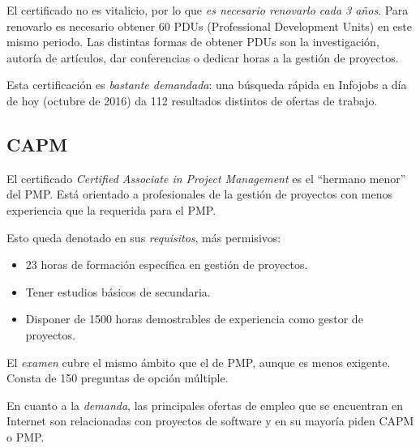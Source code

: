 El certificado no es vitalicio, por lo que \emph{es necesario renovarlo cada 3 años}. Para renovarlo es necesario obtener 60 PDUs (Professional Development Units) en este mismo periodo. Las distintas formas de obtener PDUs son la investigación, autoría de artículos, dar conferencias o dedicar horas a la gestión de proyectos.

Esta certificación es \emph{bastante demandada}: una búsqueda rápida en Infojobs a día de hoy (octubre de 2016) da 112 resultados distintos de ofertas de trabajo.

\subsection{CAPM}

El certificado \emph{Certified Associate in Project Management} es el ``hermano menor'' del PMP. Está orientado a profesionales de la gestión de proyectos con menos experiencia que la requerida para el PMP.

Esto queda denotado en sus \emph{requisitos}, más permisivos:

\begin{itemize}
\item 23 horas de formación específica en gestión de proyectos.
\item Tener estudios básicos de secundaria.
\item Disponer de 1500 horas demostrables de experiencia como gestor de proyectos.
\end{itemize}

El \emph{examen} cubre el mismo ámbito que el de PMP, aunque es menos exigente. Consta de 150 preguntas de opción múltiple.

En cuanto a la \emph{demanda}, las principales ofertas de empleo que se encuentran en Internet son relacionadas con proyectos de software y en su mayoría piden CAPM o PMP.
